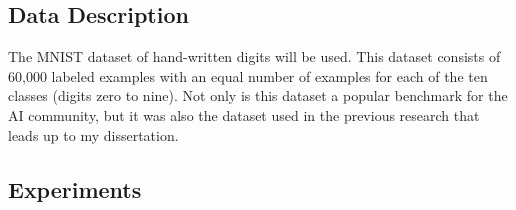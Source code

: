 \documentclass[runningheads]{llncs}
\begin{document}
\subsection{Data Description}
The MNIST dataset \cite{lecun1998mnist} of hand-written digits will be used. This dataset consists of 60,000 labeled examples with an equal number of examples for each of the ten classes (digits zero to nine). Not only is this dataset a popular benchmark for the AI community, but it was also the dataset used in the previous research that leads up to my dissertation.

\subsection{Experiments}
\label{sec:proposedSolution_exp}
\end{document}

